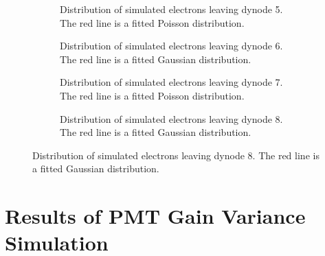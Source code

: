 \begin{figure}
\vspace{3mm}

\begin{subfigure}[b]{0.44\textwidth}
\caption{Distribution of simulated electrons leaving dynode 5. The red line is a fitted Poisson distribution.}
\end{subfigure}
\hspace{3mm}
\begin{subfigure}[b]{0.44\textwidth}
\caption{Distribution of simulated electrons leaving dynode 6. The red line is a fitted Gaussian distribution.}
\end{subfigure}

\vspace{3mm}

\begin{subfigure}[b]{0.44\textwidth}
\caption{Distribution of simulated electrons leaving dynode 7. The red line is a fitted Poisson distribution.}
\end{subfigure}
\hspace{3mm}
\begin{subfigure}[b]{0.44\textwidth}
\caption{Distribution of simulated electrons leaving dynode 8. The red line is a fitted Gaussian distribution.}
\end{subfigure}
\end{figure}

\section{Results of PMT Gain Variance Simulation}


